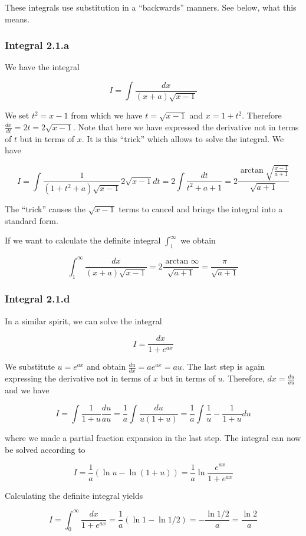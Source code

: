 
These integrals use substitution in a ``backwards'' manners. See below,
what this means.

\subsubsection{Integral 2.1.a}

We have the integral

\[
I = \int \frac{dx}{(x+a)\sqrt{x-1}}
\]

We set \(t^2 = x-1\) from which we have \(t=\sqrt{x-1}\) and
\(x=1+t^2\). Therefore \(\frac{dx}{dt} = 2t = 2\sqrt{x-1}\). Note that
here we have expressed the derivative not in terms of \(t\) but in terms
of \(x\). It is this ``trick'' which allows to solve the integral. We
have

\[
I = \int \frac{1}{(1+t^2+a)\sqrt{x-1}}2\sqrt{x-1}dt = 2 \int \frac{dt}{t^2+a+1} = 2 \frac{\arctan {\sqrt{\frac{x-1}{a+1}}}}{\sqrt{a+1}}
\]

The ``trick'' causes the \(\sqrt{x-1}\) terms to cancel and brings the
integral into a standard form.

If we want to calculate the definite integral \(\int_1^\infty\) we
obtain

\[
\int_1^\infty \frac{dx}{(x+a)\sqrt{x-1}} = 2 \frac{\arctan \infty}{\sqrt{a+1}} = \frac{\pi}{\sqrt{a+1}}
\]

\subsubsection{Integral 2.1.d}

In a similar spirit, we can solve the integral

\[
I = \frac{dx}{1+e^{ax}}
\]

We substitute \(u = e^{ax}\) and obtain
\(\frac{du}{dx} = a e^{ax} = au\). The last step is again expressing the
derivative not in terms of \(x\) but in terms of \(u\). Therefore,
\(dx = \frac{du}{au}\) and we have

\[
I = \int \frac{1}{1+u} \frac{du}{au} = \frac{1}{a} \int \frac{du}{u(1+u)} = \frac{1}{a} \int \frac{1}{u} - \frac{1}{1+u} du
\]

where we made a partial fraction expansion in the last step. The
integral can now be solved according to

\[
I = \frac{1}{a} \left( \ln u - \ln (1+u) \right) = \frac{1}{a} \ln \frac{e^{ax}}{1+e^{ax}}
\]

Calculating the definite integral yields

\[
I = \int_0^\infty \frac{dx}{1+e^{ax}} = \frac{1}{a} \left( \ln 1 - \ln 1/2 \right) = -\frac{\ln 1/2}{a} = \frac{\ln 2}{a}
\]


